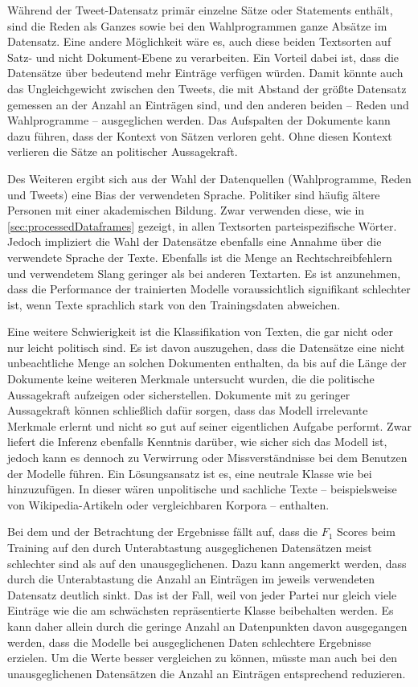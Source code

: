 Während der Tweet-Datensatz primär einzelne Sätze oder Statements enthält, sind die Reden als Ganzes sowie bei den Wahlprogrammen ganze Absätze im Datensatz. Eine andere Möglichkeit wäre es, auch diese beiden Textsorten auf Satz- und nicht Dokument-Ebene zu verarbeiten. Ein Vorteil dabei ist, dass die Datensätze über bedeutend mehr Einträge verfügen würden. Damit könnte auch das Ungleichgewicht zwischen den Tweets, die mit Abstand der größte Datensatz gemessen an der Anzahl an Einträgen sind, und den anderen beiden -- Reden und Wahlprogramme -- ausgeglichen werden. Das Aufspalten der Dokumente kann dazu führen, dass der Kontext von Sätzen verloren geht. Ohne diesen Kontext verlieren die Sätze an politischer Aussagekraft.

Des Weiteren ergibt sich aus der Wahl der Datenquellen (Wahlprogramme, Reden und Tweets) eine Bias der verwendeten Sprache. Politiker sind häufig ältere Personen mit einer akademischen Bildung. Zwar verwenden diese, wie in \autoref{sec:processedDataframes} gezeigt, in allen Textsorten parteispezifische Wörter. Jedoch impliziert die Wahl der Datensätze ebenfalls eine Annahme über die verwendete Sprache der Texte. Ebenfalls ist die Menge an Rechtschreibfehlern und verwendetem Slang geringer als bei anderen Textarten. Es ist anzunehmen, dass die Performance der trainierten Modelle voraussichtlich signifikant schlechter ist, wenn Texte sprachlich stark von den Trainingsdaten abweichen.

Eine weitere Schwierigkeit ist die Klassifikation von Texten, die gar nicht oder nur leicht politisch sind. Es ist davon auszugehen, dass die Datensätze eine nicht unbeachtliche Menge an solchen Dokumenten enthalten, da bis auf die Länge der Dokumente keine weiteren Merkmale untersucht wurden, die die politische Aussagekraft aufzeigen oder sicherstellen. Dokumente mit zu geringer Aussagekraft können schließlich dafür sorgen, dass das Modell irrelevante Merkmale erlernt und nicht so gut auf seiner eigentlichen Aufgabe performt. Zwar liefert die Inferenz ebenfalls Kenntnis darüber, wie sicher sich das Modell ist, jedoch kann es dennoch zu Verwirrung oder Missverständnisse bei dem Benutzen der Modelle führen. Ein Lösungsansatz ist es, eine neutrale Klasse wie bei \textcite{guhr_training_2020} hinzuzufügen. In dieser wären unpolitische und sachliche Texte -- beispielsweise von Wikipedia-Artikeln oder vergleichbaren Korpora -- enthalten.

Bei dem  und der Betrachtung der Ergebnisse fällt auf, dass die \(F_1\) Scores beim Training auf den durch Unterabtastung ausgeglichenen Datensätzen meist schlechter sind als auf den unausgeglichenen. Dazu kann angemerkt werden, dass durch die Unterabtastung die Anzahl an Einträgen im jeweils verwendeten Datensatz deutlich sinkt. Das ist der Fall, weil von jeder Partei nur gleich viele Einträge wie die am schwächsten repräsentierte Klasse beibehalten werden. Es kann daher allein durch die geringe Anzahl an Datenpunkten davon ausgegangen werden, dass die Modelle bei ausgeglichenen Daten schlechtere Ergebnisse erzielen. Um die Werte besser vergleichen zu können, müsste man auch bei den unausgeglichenen Datensätzen die Anzahl an Einträgen entsprechend reduzieren.

